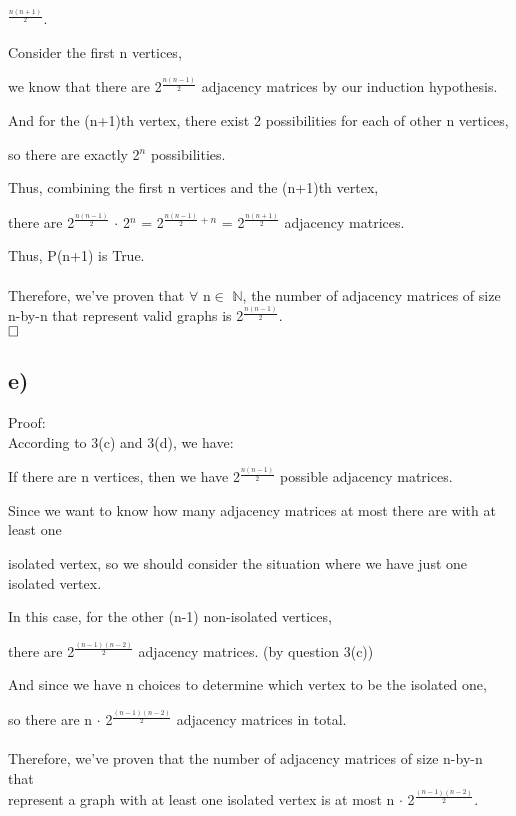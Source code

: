 \documentclass[12pt]{article}
\begin{document}
\quad \quad \quad \quad \quad \quad \quad \quad \quad \quad \quad \quad \quad \quad \quad \quad \quad {}$^{\frac{n(n+1)}{2}}$.

Consider the first n vertices, 

we know that there are 2$^{\frac{n(n-1)}{2}}$ adjacency matrices by our induction hypothesis.

And for the (n+1)th vertex, there exist 2 possibilities for each of other n vertices,

so there are exactly 2$^{n}$ possibilities.

Thus, combining the first n vertices and the (n+1)th vertex, 

there are 2$^{\frac{n(n-1)}{2}}$ $\cdot$ 2$^{n}$ = 2$^{\frac{n(n-1)}{2} + n}$ = 2$^{\frac{n(n+1)}{2}}$ adjacency matrices.

Thus, P(n+1) is True.\\
\\
Therefore, we've proven that $\forall$ n$\in$ $\mathbb{N}$, the number of adjacency matrices of size n-by-n that represent valid graphs is 2$^{\frac{n(n-1)}{2}}$.\\

$\hfill\square$
\newpage
\vspace{20pt}
\subsection*{e)}
\vspace{30pt}
Proof:\\

According to 3(c) and 3(d), we have:

If there are n vertices, then we have 2$^{\frac{n(n-1)}{2}}$ possible adjacency matrices.

Since we want to know how many adjacency matrices at most there are with at least one 

isolated vertex, so we should consider the situation where we have just one isolated vertex.

In this case, for the other (n-1) non-isolated vertices, 

there are 2$^{\frac{(n-1)(n-2)}{2}}$ adjacency matrices. (by question 3(c))

And since we have n choices to determine which vertex to be the isolated one, 

so there are n $\cdot$ 2$^{\frac{(n-1)(n-2)}{2}}$ adjacency matrices in total.\\
\\
Therefore, we've proven that the number of adjacency matrices of  size n-by-n that\\ 
represent a graph with at least one isolated vertex is at most n $\cdot$ 2$^{\frac{(n-1)(n-2)}{2}}$.\\
\end{document}
